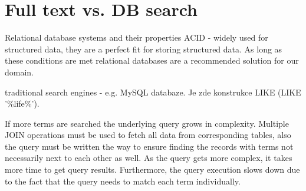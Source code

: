 %
%
%
%
%
%
%
%
%
%
%
%
%
%
%
%
%

\section{Full text vs. DB search}

Relational database systems and their properties ACID - widely used
for structured data, they are a perfect fit for storing structured
data. As long as these conditions are met relational databases are
a recommended solution for our domain.

traditional search engines - e.g. MySQL databaze. Je zde konstrukce
LIKE (LIKE '\%life\%').

If more terms are searched the underlying query grows in complexity.
Multiple JOIN operations must be used to fetch all data from corresponding
tables, also the query must be written the way to ensure finding the
records with terms not necessarily next to each other as well. As
the query gets more complex, it takes more time to get query results.
Furthermore, the query execution slows down due to the fact that the
query needs to match each term individually.

